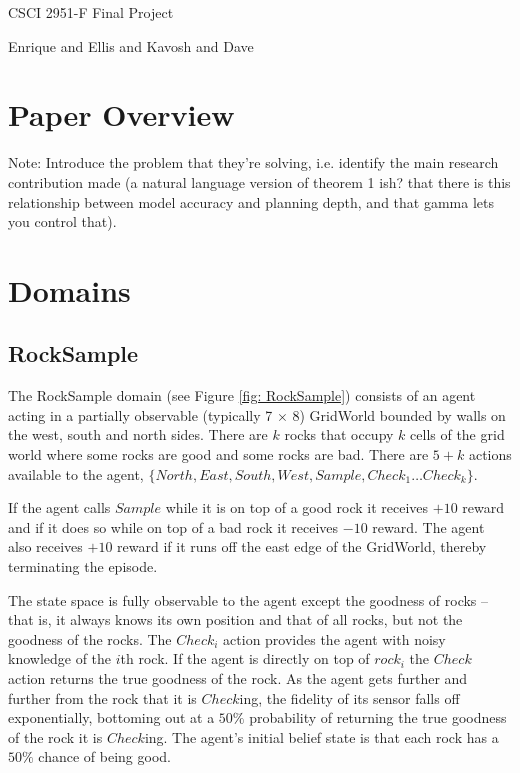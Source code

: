 \documentclass[11pt]{article} %
\begin{document}
\centerline{\LARGE{CSCI 2951-F Final Project}}
\centerline{Enrique and Ellis and Kavosh and Dave}
\vspace{2mm}


\section{Paper Overview}

Note: Introduce the problem that they're solving, i.e. identify the main research contribution made (a natural language version of theorem 1 ish? that there is this relationship between model accuracy and planning depth, and that gamma lets you control that).


\section{Domains}

\subsection{RockSample}
The RockSample domain (see Figure \ref{fig: RockSample}) consists of an agent acting in a partially observable (typically 7 $\times$ 8) GridWorld bounded by walls on the west, south and north sides. There are $k$ rocks that occupy $k$ cells of the grid world where some rocks are good and some rocks are bad. There are $5+k$ actions available to the agent, $\{North, East, South, West, Sample, Check_1 \ldots Check_k\}$. 

If the agent calls $Sample$ while it is on top of a good rock it receives $+10$ reward and if it does so while on top of a bad rock it receives $-10$ reward. The agent also receives $+10$ reward if it runs off the east edge of the GridWorld, thereby terminating the episode.

The state space is fully observable to the agent except the goodness of rocks -- that is, it always knows its own position and that of all rocks, but not the goodness of the rocks. The $Check_i$ action provides the agent with noisy knowledge of the $i$th rock. If the agent is directly on top of $rock_i$ the $Check$ action returns the true goodness of the rock. As the agent gets further and further from the rock that it is $Check$ing, the fidelity of its sensor falls off exponentially, bottoming out at a $50\%$ probability of returning the true goodness of the rock it is $Check$ing. The agent's initial belief state is that each rock has a $50\%$ chance of being good.
\end{document}
